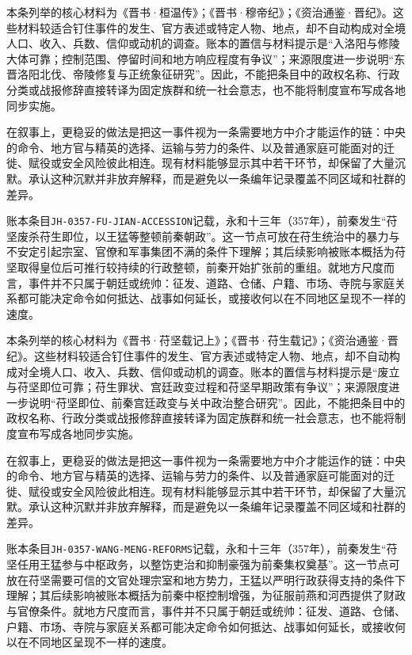 本条列举的核心材料为《晋书·桓温传》；《晋书·穆帝纪》；《资治通鉴·晋纪》。这些材料较适合钉住事件的发生、官方表述或特定人物、地点，却不自动构成对全境人口、收入、兵数、信仰或动机的调查。账本的置信与材料提示是“入洛阳与修陵大体可靠；控制范围、停留时间和地方响应程度有争议”；来源限度进一步说明“东晋洛阳北伐、帝陵修复与正统象征研究”。因此，不能把条目中的政权名称、行政分类或战报修辞直接转译为固定族群和统一社会意志，也不能将制度宣布写成各地同步实施。

在叙事上，更稳妥的做法是把这一事件视为一条需要地方中介才能运作的链：中央的命令、地方官与精英的选择、运输与劳力的条件、以及普通家庭可能面对的迁徙、赋役或安全风险彼此相连。现有材料能够显示其中若干环节，却保留了大量沉默。承认这种沉默并非放弃解释，而是避免以一条编年记录覆盖不同区域和社群的差异。

账本条目\texttt{JH-0357-FU-JIAN-ACCESSION}记载，永和十三年（357年），前秦发生“苻坚废杀苻生即位，以王猛等整顿前秦朝政”。这一节点可放在苻生统治中的暴力与不安定引起宗室、官僚和军事集团不满的条件下理解；其后续影响被账本概括为苻坚取得皇位后可推行较持续的行政整顿，前秦开始扩张前的重组。就地方尺度而言，事件并不只属于朝廷或统帅：征发、道路、仓储、户籍、市场、寺院与家庭关系都可能决定命令如何抵达、战事如何延长，或接收何以在不同地区呈现不一样的速度。

本条列举的核心材料为《晋书·苻坚载记上》；《晋书·苻生载记》；《资治通鉴·晋纪》。这些材料较适合钉住事件的发生、官方表述或特定人物、地点，却不自动构成对全境人口、收入、兵数、信仰或动机的调查。账本的置信与材料提示是“废立与苻坚即位可靠；苻生罪状、宫廷政变过程和苻坚早期政策有争议”；来源限度进一步说明“苻坚即位、前秦宫廷政变与关中政治整合研究”。因此，不能把条目中的政权名称、行政分类或战报修辞直接转译为固定族群和统一社会意志，也不能将制度宣布写成各地同步实施。

在叙事上，更稳妥的做法是把这一事件视为一条需要地方中介才能运作的链：中央的命令、地方官与精英的选择、运输与劳力的条件、以及普通家庭可能面对的迁徙、赋役或安全风险彼此相连。现有材料能够显示其中若干环节，却保留了大量沉默。承认这种沉默并非放弃解释，而是避免以一条编年记录覆盖不同区域和社群的差异。

账本条目\texttt{JH-0357-WANG-MENG-REFORMS}记载，永和十三年（357年），前秦发生“苻坚任用王猛参与中枢政务，以整饬吏治和抑制豪强为前秦集权奠基”。这一节点可放在苻坚需要可信的文官处理宗室和地方势力，王猛以严明行政获得支持的条件下理解；其后续影响被账本概括为前秦中枢控制增强，为征服前燕和河西提供了财政与官僚条件。就地方尺度而言，事件并不只属于朝廷或统帅：征发、道路、仓储、户籍、市场、寺院与家庭关系都可能决定命令如何抵达、战事如何延长，或接收何以在不同地区呈现不一样的速度。


